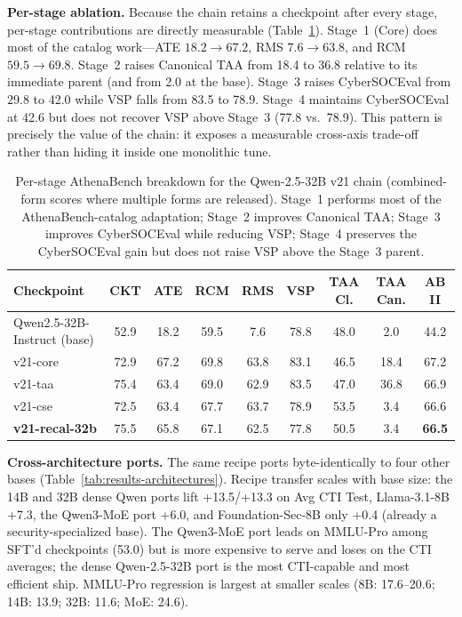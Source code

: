 \documentclass[conference]{IEEEtran}
\begin{document}
\textbf{Per-stage ablation.} Because the chain retains a checkpoint after every stage, per-stage contributions are directly measurable (Table~\ref{tab:results-per-stage}). Stage~1 (Core) does most of the catalog work---ATE $18.2\to67.2$, RMS $7.6\to63.8$, and RCM $59.5\to69.8$. Stage~2 raises Canonical TAA from 18.4 to 36.8 relative to its immediate parent (and from 2.0 at the base). Stage~3 raises CyberSOCEval from 29.8 to 42.0 while VSP falls from 83.5 to 78.9. Stage~4 maintains CyberSOCEval at 42.6 but does not recover VSP above Stage~3 (77.8 vs.\ 78.9). This pattern is precisely the value of the chain: it exposes a measurable cross-axis trade-off rather than hiding it inside one monolithic tune.

\begin{table}[t]
\centering
\caption{Per-stage AthenaBench breakdown for the Qwen-2.5-32B v21 chain (combined-form scores where multiple forms are released). Stage~1 performs most of the AthenaBench-catalog adaptation; Stage~2 improves Canonical TAA; Stage~3 improves CyberSOCEval while reducing VSP; Stage~4 preserves the CyberSOCEval gain but does not raise VSP above the Stage~3 parent.}
\label{tab:results-per-stage}
\small
\begin{tabular}{lcccccccc}
\hline
\textbf{Checkpoint} & \textbf{CKT} & \textbf{ATE} & \textbf{RCM} & \textbf{RMS} & \textbf{VSP} & \textbf{TAA Cl.} & \textbf{TAA Can.} & \textbf{AB II} \\
\hline
Qwen2.5-32B-Instruct (base) & 52.9 & 18.2 & 59.5 & 7.6  & 78.8 & 48.0 & 2.0  & 44.2 \\
v21-core                    & 72.9 & 67.2 & 69.8 & 63.8 & 83.1 & 46.5 & 18.4 & 67.2 \\
v21-taa                     & 75.4 & 63.4 & 69.0 & 62.9 & 83.5 & 47.0 & 36.8 & 66.9 \\
v21-cse                     & 72.5 & 63.4 & 67.7 & 63.7 & 78.9 & 53.5 & 3.4  & 66.6 \\
\textbf{v21-recal-32b}      & 75.5 & 65.8 & 67.1 & 62.5 & 77.8 & 50.5 & 3.4  & \textbf{66.5} \\
\hline
\end{tabular}
\end{table}
\textbf{Cross-architecture ports.} The same recipe ports byte-identically to four other bases (Table~\ref{tab:results-architectures}). Recipe transfer scales with base size: the 14B and 32B dense Qwen ports lift +13.5/+13.3 on Avg CTI Test, Llama-3.1-8B +7.3, the Qwen3-MoE port +6.0, and Foundation-Sec-8B only +0.4 (already a security-specialized base). The Qwen3-MoE port leads on MMLU-Pro among SFT'd checkpoints (53.0) but is more expensive to serve and loses on the CTI averages; the dense Qwen-2.5-32B port is the most CTI-capable and most efficient ship. MMLU-Pro regression is largest at smaller scales (8B: 17.6--20.6; 14B: 13.9; 32B: 11.6; MoE: 24.6).
\end{document}
